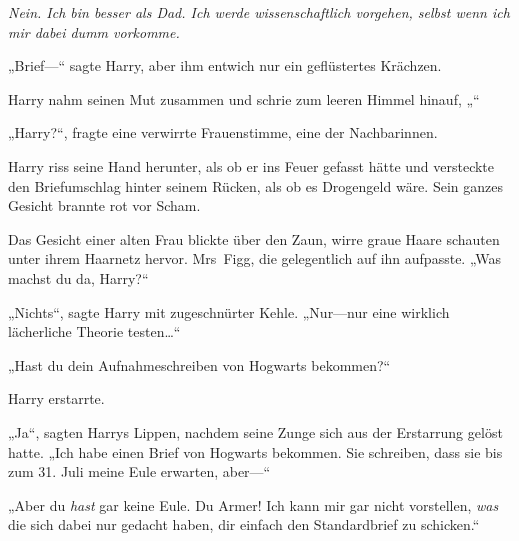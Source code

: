 \emph{Nein. Ich bin besser als Dad. Ich werde wissenschaftlich vorgehen, selbst wenn ich mir dabei dumm vorkomme.}

„Brief—“ sagte Harry, aber ihm entwich nur ein geflüstertes Krächzen.

Harry nahm seinen Mut zusammen und schrie zum leeren Himmel hinauf, „“

„Harry?“, fragte eine verwirrte Frauenstimme, eine der Nachbarinnen.

Harry riss seine Hand herunter, als ob er ins Feuer gefasst hätte und versteckte den Briefumschlag hinter seinem Rücken, als ob es Drogengeld wäre. Sein ganzes Gesicht brannte rot vor Scham.

Das Gesicht einer alten Frau blickte über den Zaun, wirre graue Haare schauten unter ihrem Haarnetz hervor. Mrs~Figg, die gelegentlich auf ihn aufpasste. „Was machst du da, Harry?“

„Nichts“, sagte Harry mit zugeschnürter Kehle. „Nur—nur eine wirklich lächerliche Theorie testen…“

„Hast du dein Aufnahmeschreiben von Hogwarts bekommen?“

Harry erstarrte.

„Ja“, sagten Harrys Lippen, nachdem seine Zunge sich aus der Erstarrung gelöst hatte. „Ich habe einen Brief von Hogwarts bekommen. Sie schreiben, dass sie bis zum 31. Juli meine Eule erwarten, aber—“

„Aber du \emph{hast} gar keine Eule. Du Armer! Ich kann mir gar nicht vorstellen, \emph{was} die sich dabei nur gedacht haben, dir einfach den Standardbrief zu schicken.“

